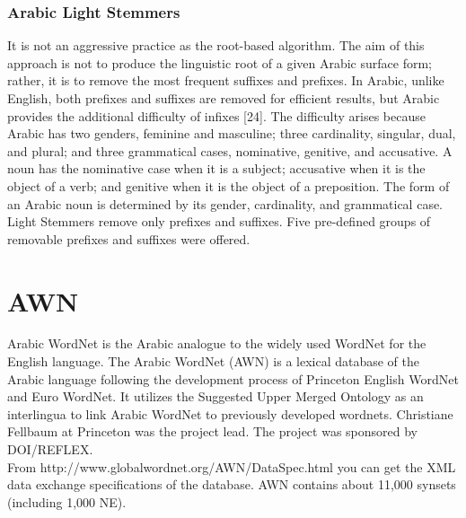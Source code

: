 \subsubsection{Arabic Light Stemmers}
It is not an aggressive practice as the root-based algorithm. The aim of this approach is not to produce the linguistic root of a given Arabic surface form; rather, it is to remove the most frequent suffixes and prefixes.
In Arabic, unlike English, both prefixes and
suffixes are removed for efficient results, but Arabic provides the additional difficulty of infixes
[24]. The difficulty arises because Arabic has two genders, feminine and masculine; three
cardinality, singular, dual, and plural; and three grammatical cases, nominative, genitive, and
accusative. A noun has the nominative case when it is a subject; accusative when it is the object
of a verb; and genitive when it is the object of a preposition. The form of an Arabic noun is
determined by its gender, cardinality, and grammatical case. Light Stemmers remove only prefixes and suffixes. Five pre-defined groups of removable
prefixes and suffixes were offered.



\section{AWN}
Arabic WordNet is the Arabic analogue to the widely used WordNet for the English language. The Arabic WordNet (AWN) is a lexical database of the Arabic language following the development process of Princeton English WordNet and Euro WordNet. It utilizes the Suggested Upper Merged Ontology as an interlingua to link Arabic WordNet to previously developed wordnets. Christiane Fellbaum at Princeton was the project lead. The project was sponsored by DOI/REFLEX.\\
From http://www.globalwordnet.org/AWN/DataSpec.html you can get the XML data exchange specifications of the database. AWN contains about 11,000 synsets (including 1,000 NE).\\

